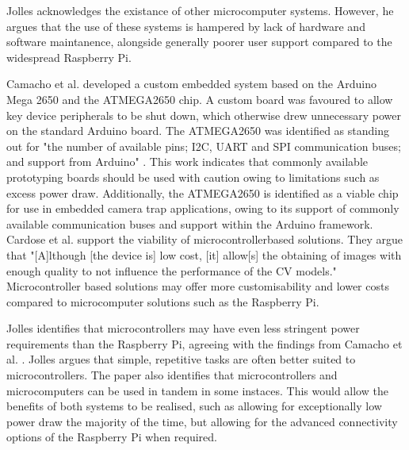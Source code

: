 \documentclass[class=report,11pt,crop=false]{standalone}
\begin{document}
Jolles \cite{Jolles-Broad-scale} acknowledges the existance of other microcomputer systems. However, he argues that the use of these systems is hampered by lack of hardware and software maintanence, alongside generally poorer user support compared to the widespread Raspberry Pi. 

Camacho et al. \cite{Camacho-DeploymentOf} developed a custom embedded system based on the Arduino Mega 2650 and the ATMEGA2650 chip. A custom board was favoured to allow key device peripherals to be shut down, which otherwise drew unnecessary power on the standard Arduino board. The ATMEGA2650 was identified as standing out for "the number of available pins; I2C, UART and SPI communication buses; and support from Arduino" \cite{Camacho-DeploymentOf}. This work indicates that commonly available prototyping boards should be used with caution owing to limitations such as excess power draw. Additionally, the ATMEGA2650 is identified as a viable chip for use in embedded camera trap applications, owing to its support of commonly available communication buses and support within the Arduino framework. Cardose et al. \cite{Cardoso-InternetOf} support the viability of microcontrollerbased solutions. They \cite{Cardoso-InternetOf} argue that "[A]lthough [the device is] low cost, [it] allow[s] the obtaining of images with enough quality to not influence the performance of the CV models." Microcontroller based solutions may offer more customisability and lower costs compared to microcomputer solutions such as the Raspberry Pi.

Jolles \cite{Jolles-Broad-scale} identifies that microcontrollers may have even less stringent power requirements than the Raspberry Pi, agreeing with the findings from Camacho et al. \cite{Camacho-DeploymentOf}. Jolles \cite{Jolles-Broad-scale} argues that simple, repetitive tasks are often better suited to microcontrollers. The paper also identifies that microcontrollers and microcomputers can be used in tandem in some instaces. This would allow the benefits of both systems to be realised, such as allowing for exceptionally low power draw the majority of the time, but allowing for the advanced connectivity options of the Raspberry Pi when required.




\ifstandalone

\printnoidxglossary[type=\acronymtype,nonumberlist]
\fi
\end{document}
